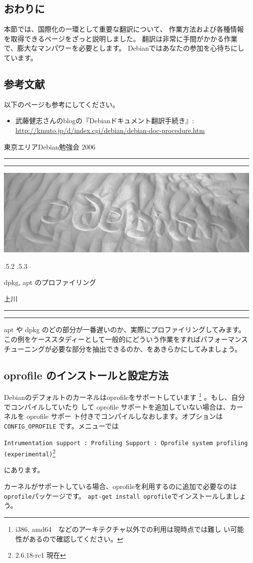 \documentclass[mingoth,a4paper]{jsarticle}
\makeatletter
\renewcommand{\section}{\@startsection{section}{1}{\z@}%
    {\Cvs \@plus.5\Cdp \@minus.2\Cdp}%
    {.5\Cvs \@plus.3\Cdp}%
    {\normalfont\Huge\headfont\raggedright\centering}} %
\newcommand{\dancersection}[2]{%
\newpage
東京エリアDebian勉強会 2006
\hrule
\vspace{0.5mm}
\hrule
\hfill{}\includegraphics[width=16cm]{image2006-natsu/guruguru-sand-light.png}\\
\vspace{-5cm}
\begin{center}
\section{#1}
\end{center}
\hfill{}\colorbox{white}{#2}\hspace{3cm}\space\\
\vspace{1cm}
\hrule
\vspace{0.5mm}
\hrule
\vspace{1cm}
}
\makeatother
\begin{document}
\subsection{おわりに}

本節では、国際化の一環として重要な翻訳について、
作業方法および各種情報を取得できるページをざっと説明しました。
翻訳は非常に手間がかかる作業で、膨大なマンパワーを必要とします。
Debianではあなたの参加を心待ちにしています。

\subsection{参考文献}

以下のページも参考にしてください。

\begin{itemize}
 \item 武藤健志さんのblogの『Debianドキュメント翻訳手続き』:
       \url{http://kmuto.jp/d/index.cgi/debian/debian-doc-procedure.htm}
\end{itemize}


\dancersection{dpkg, apt のプロファイリング}{上川}
\label{sec:dancerjapt}

apt や dpkg のどの部分が一番遅いのか、実際にプロファイリングしてみます。
この例をケーススタディーとして一般的にどういう作業をすればパフォーマンス
チューニングが必要な部分を抽出できるのか、をあきらかにしてみましょう。

\subsection{oprofile のインストールと設定方法}

Debianのデフォルトのカーネルはoprofileをサポートしています
\footnote{i386, amd64　などのアーキテクチャ以外での利用は現時点では難し
い可能性があるので確認してください。} 。もし、自分でコンパイルしていたり
して oprofile サポートを追加していない場合は、カーネルを oprofile サポー
ト付きでコンパイルしなおします。オプションは \texttt{CONFIG\_OPROFILE}
です。メニューでは

\texttt{Intrumentation support : Profiling Support :
Oprofile system profiling (experimental)}\footnote{2.6.18-rc1 現在}

にあります。

カーネルがサポートしている場合、oprofileを利用するのに追加で必要なのは
\texttt{oprofile}パッケージです。
\texttt{apt-get install oprofile}でインストールしましょう。
\end{document}
